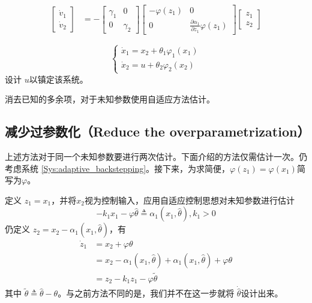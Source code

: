 \begin{note}
\begin{align*}
  \left[\begin{array}{c}
    \dot{v}_1\\
    \dot{v}_2
  \end{array}\right] & = - \left[\begin{array}{cc}
    \gamma_1 & 0\\
    0 & \gamma_2
  \end{array}\right] \left[\begin{array}{cc}
    - \varphi (z_1) & 0\\
    0 & \frac{\partial \alpha_1}{\partial z_1} \varphi (z_1)
  \end{array}\right] \left[\begin{array}{c}
    z_1\\
    z_2
  \end{array}\right]
\end{align*}
\end{note}

\begin{problem}
  \[ \left\{\begin{array}{l}
       \dot{x}_1 = x_2 + \theta_1 \varphi_1 (x_1)\\
       \dot{x}_2 = u + \theta_2 \varphi_2 (x_2)
     \end{array}\right. \]
  设计 $u$以镇定该系统。
\end{problem}
\begin{hint}
    消去已知的多余项，对于未知参数使用自适应方法估计。
\end{hint}

\subsection{减少过参数化（Reduce the overparametrization）}

上述方法对于同一个未知参数要进行两次估计。下面介绍的方法仅需估计一次。仍考虑系统 \eqref{Sys:adaptive_backstepping}。接下来，为求简便，$\varphi(z_1)=\varphi(x_1)$简写为$\varphi$。


定义 $z_1 = x_1$，并将$x_2$视为控制输入，应用自适应控制思想对未知参数进行估计
\begin{equation*}
   - k_1 x_1 - \varphi \hat{\theta} \triangleq \alpha_1 (x_1,
  \hat{\theta}),k_1>0
\end{equation*}
仍定义 $z_2 = x_2 - \alpha_1 (x_1, \hat{\theta})$，有
\begin{align*}
  \dot{z}_1 & = x_2 + \varphi \theta\\
  & = x_2 - \alpha_1 (x_1, \hat{\theta}) + \alpha_1 (x_1, \hat{\theta}) +
  \varphi \theta\\
  & = z_2 - k_1 z_1 - \varphi \tilde{\theta}
\end{align*}
其中 $\tilde{\theta} \triangleq \hat{\theta} - \theta$。与之前方法不同的是，我们并不在这一步就将 $\dot{\hat{\theta}}$设计出来。

